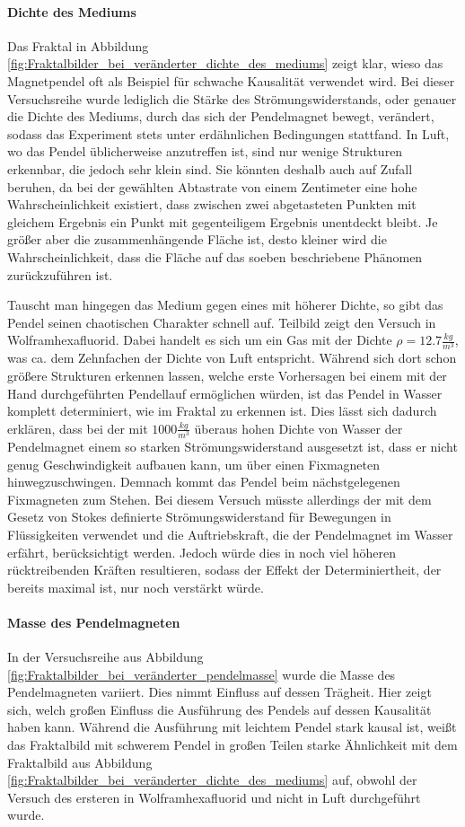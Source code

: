 \paragraph{Dichte des Mediums} Das Fraktal \pa in Abbildung \ref{fig:Fraktalbilder_bei_veränderter_dichte_des_mediums} zeigt klar, wieso das Magnetpendel oft als Beispiel für schwache Kausalität verwendet wird. Bei dieser Versuchsreihe wurde lediglich die Stärke des Strömungswiderstands, oder genauer die Dichte des Mediums, durch das sich der Pendelmagnet bewegt, verändert, sodass das Experiment stets unter erdähnlichen Bedingungen stattfand. In Luft, wo das Pendel üblicherweise anzutreffen ist, sind nur wenige Strukturen erkennbar, die jedoch sehr klein sind. Sie könnten deshalb auch auf Zufall beruhen, da bei der gewählten Abtastrate von einem Zentimeter eine hohe Wahrscheinlichkeit existiert, dass zwischen zwei abgetasteten Punkten mit gleichem Ergebnis ein Punkt mit gegenteiligem Ergebnis unentdeckt bleibt. Je größer aber die zusammenhängende Fläche ist, desto kleiner wird die Wahrscheinlichkeit, dass die Fläche auf das soeben beschriebene Phänomen zurückzuführen ist.

Tauscht man hingegen das Medium gegen eines mit höherer Dichte, so gibt das Pendel seinen chaotischen Charakter schnell auf. Teilbild \pb zeigt den Versuch in Wolframhexafluorid. Dabei handelt es sich um ein Gas mit der Dichte $\rho = 12.7 \frac{kg}{m^3}$, was ca. dem Zehnfachen der Dichte von Luft entspricht. Während sich dort schon größere Strukturen erkennen lassen, welche erste Vorhersagen bei einem mit der Hand durchgeführten Pendellauf ermöglichen würden, ist das Pendel in Wasser komplett determiniert, wie im Fraktal \pc zu erkennen ist. Dies lässt sich dadurch erklären, dass bei der mit $1000 \frac{kg}{m^3}$ überaus hohen Dichte von Wasser der Pendelmagnet einem so starken Strömungswiderstand ausgesetzt ist, dass er nicht genug Geschwindigkeit aufbauen kann, um über einen Fixmagneten hinwegzuschwingen. Demnach kommt das Pendel beim nächstgelegenen Fixmagneten zum Stehen. Bei diesem Versuch müsste allerdings der mit dem Gesetz von Stokes definierte Strömungswiderstand für Bewegungen in Flüssigkeiten verwendet und die Auftriebskraft, die der Pendelmagnet im Wasser erfährt, berücksichtigt werden. Jedoch würde dies in noch viel höheren rücktreibenden Kräften resultieren, sodass der Effekt der Determiniertheit, der bereits maximal ist, nur noch verstärkt würde.

\paragraph{Masse des Pendelmagneten} In der Versuchsreihe aus Abbildung \ref{fig:Fraktalbilder_bei_veränderter_pendelmasse} wurde die Masse des Pendelmagneten variiert. Dies nimmt Einfluss auf dessen Trägheit. Hier zeigt sich, welch großen Einfluss die Ausführung des Pendels auf dessen Kausalität haben kann. Während die Ausführung \pc mit leichtem Pendel stark kausal ist, weißt das Fraktalbild \pa mit schwerem Pendel in großen Teilen starke Ähnlichkeit mit dem Fraktalbild \pa aus Abbildung \ref{fig:Fraktalbilder_bei_veränderter_dichte_des_mediums} auf, obwohl der Versuch des ersteren in Wolframhexafluorid und nicht in Luft durchgeführt wurde.

